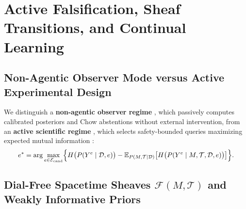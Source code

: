 \documentclass[11pt,a4paper]{article}
\theoremstyle{definition}
\theoremstyle{remark}
\newcommand{\E}{\mathbb{E}}
\begin{document}
\section{Active Falsification, Sheaf Transitions, and Continual Learning}
\label{sec:dynamics}

\subsection{Non-Agentic Observer Mode versus Active Experimental Design}

We distinguish a \textbf{non-agentic observer regime} \cite{bengio2025scientist}, which passively computes calibrated posteriors and Chow abstentions without external intervention, from an \textbf{active scientific regime} \cite{nozick2001invariances,popper1959logic,curie1894symetrie}, which selects safety-bounded queries maximizing expected mutual information \cite{lindley1956measure,houlsby2011bayesian}:
\begin{equation}
  e^* = \arg\max_{e \in \mathcal{E}_{\mathrm{cand}}} \Bigl\{ H\bigl( P(Y^e \mid \mathcal{D}, e) \bigr) - \E_{P(M, \mathcal{T} \mid \mathcal{D})} \bigl[ H\bigl( P(Y^e \mid M, \mathcal{T}, \mathcal{D}, e) \bigr) \bigr] \Bigr\}.
  \label{eq:boed}
\end{equation}

\subsection{\texorpdfstring{Dial-Free Spacetime Sheaves $\mathcal{F}(M, \mathcal{T})$ and Weakly Informative Priors}{Dial-Free Spacetime Sheaves F(M, T) and Weakly Informative Priors}}
\end{document}
